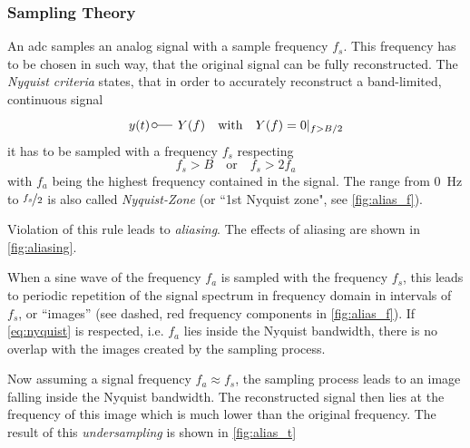 \subsubsection*{Sampling Theory}
An \gls{adc} samples an analog signal with a sample frequency $f_s$.
This frequency has to be chosen in such way, that the original signal can be fully reconstructed.
The \textit{Nyquist criteria} states, that in order to accurately reconstruct a band-limited, continuous signal %
\begin{equation}
	y (t) \, \fourier  Y(f) \quad \text{with} \quad Y(f)=0\vert_{f>B/2}
\end{equation}
it has to be sampled with a frequency $f_s$ respecting
\begin{equation} \label{eq:nyquist}
	f_s > B \quad \text{or} \quad f_s > 2 f_a
\end{equation}
with $f_a$ being the highest frequency contained in the signal. \cite{walt,puente2015}
The range from \SI{0}{\Hz} to $\nicefrac{f_s}{2}$ is also called \textit{Nyquist-Zone} (or ``1st Nyquist zone", see \autoref{fig:alias_f}).

Violation of this rule leads to \textit{aliasing}.
The effects of aliasing are shown in \autoref{fig:aliasing}.

When a sine wave of the frequency $f_a$ is sampled with the frequency $f_s$, this leads to periodic repetition of the signal spectrum in frequency domain in intervals of $f_s$, or ``images'' (see dashed, red frequency components in \autoref{fig:alias_f}). 
If \autoref{eq:nyquist} is respected, i.e. $f_a$ lies inside the Nyquist bandwidth, there is no overlap with the images created by the sampling process.

Now assuming a signal frequency $f_a \approx f_s$, the sampling process leads to an image falling inside the Nyquist bandwidth.
The reconstructed signal then lies at the frequency of this image which is much lower than the original frequency.
The result of this \textit{undersampling} is shown in \autoref{fig:alias_t}




